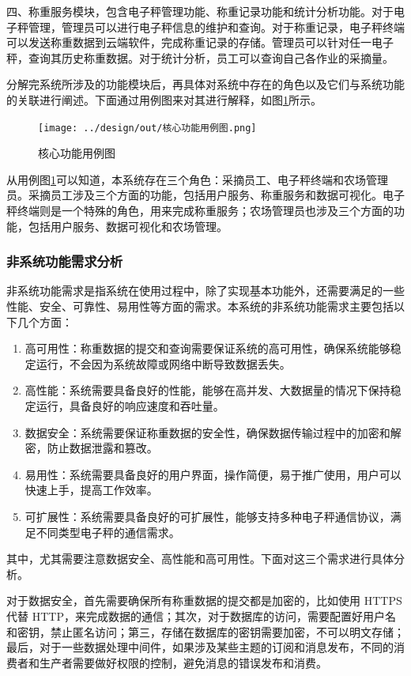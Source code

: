 \documentclass{xduugmr}
\begin{document}
四、称重服务模块，包含电子秤管理功能、称重记录功能和统计分析功能。对于电子秤管理，管理员可以进行电子秤信息的维护和查询。对于称重记录，电子秤终端可以发送称重数据到云端软件，完成称重记录的存储。管理员可以针对任一电子秤，查询其历史称重数据。对于统计分析，员工可以查询自己各作业的采摘量。

分解完系统所涉及的功能模块后，再具体对系统中存在的角色以及它们与系统功能的关联进行阐述。下面通过用例图来对其进行解释，如图\ref{fig:核心功能用例图}所示。

\begin{figure}[H]
    \centering
    \texttt{[image: ../design/out/核心功能用例图.png]}
    \caption{核心功能用例图}
    \label{fig:核心功能用例图}
\end{figure}

从用例图\ref{fig:核心功能用例图}可以知道，本系统存在三个角色：采摘员工、电子秤终端和农场管理员。采摘员工涉及三个方面的功能，包括用户服务、称重服务和数据可视化。电子秤终端则是一个特殊的角色，用来完成称重服务；农场管理员也涉及三个方面的功能，包括用户服务、数据可视化和农场管理。

\subsubsection{非系统功能需求分析}

非系统功能需求是指系统在使用过程中，除了实现基本功能外，还需要满足的一些性能、安全、可靠性、易用性等方面的需求。本系统的非系统功能需求主要包括以下几个方面：

\begin{enumerate}
    \item 高可用性：称重数据的提交和查询需要保证系统的高可用性，确保系统能够稳定运行，不会因为系统故障或网络中断导致数据丢失。
    \item 高性能：系统需要具备良好的性能，能够在高并发、大数据量的情况下保持稳定运行，具备良好的响应速度和吞吐量。
    \item 数据安全：系统需要保证称重数据的安全性，确保数据传输过程中的加密和解密，防止数据泄露和篡改。
    \item 易用性：系统需要具备良好的用户界面，操作简便，易于推广使用，用户可以快速上手，提高工作效率。
    \item 可扩展性：系统需要具备良好的可扩展性，能够支持多种电子秤通信协议，满足不同类型电子秤的通信需求。
\end{enumerate}

其中，尤其需要注意数据安全、高性能和高可用性。下面对这三个需求进行具体分析。

对于数据安全，首先需要确保所有称重数据的提交都是加密的，比如使用 HTTPS 代替 HTTP，来完成数据的通信；其次，对于数据库的访问，需要配置好用户名和密钥，禁止匿名访问；第三，存储在数据库的密钥需要加密，不可以明文存储；最后，对于一些数据处理中间件，如果涉及某些主题的订阅和消息发布，不同的消费者和生产者需要做好权限的控制，避免消息的错误发布和消费。
\end{document}
